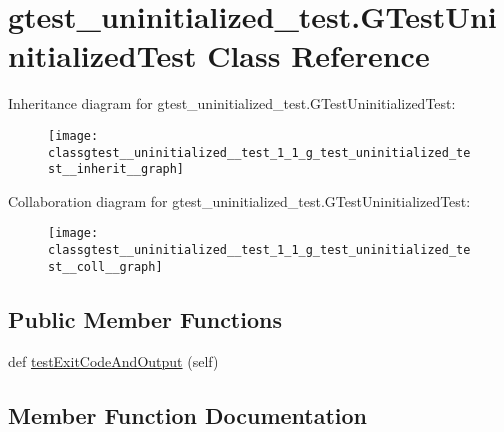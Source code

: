 \hypertarget{classgtest__uninitialized__test_1_1_g_test_uninitialized_test}{}\section{gtest\+\_\+uninitialized\+\_\+test.\+G\+Test\+Uninitialized\+Test Class Reference}
\label{classgtest__uninitialized__test_1_1_g_test_uninitialized_test}


Inheritance diagram for gtest\+\_\+uninitialized\+\_\+test.\+G\+Test\+Uninitialized\+Test\+:
\nopagebreak
\begin{figure}[H]
\begin{center}
\leavevmode
\texttt{[image: classgtest\_\_uninitialized\_\_test\_1\_1\_g\_test\_uninitialized\_test\_\_inherit\_\_graph]}
\end{center}
\end{figure}


Collaboration diagram for gtest\+\_\+uninitialized\+\_\+test.\+G\+Test\+Uninitialized\+Test\+:
\nopagebreak
\begin{figure}[H]
\begin{center}
\leavevmode
\texttt{[image: classgtest\_\_uninitialized\_\_test\_1\_1\_g\_test\_uninitialized\_test\_\_coll\_\_graph]}
\end{center}
\end{figure}
\subsection*{Public Member Functions}
\begin{DoxyCompactItemize}
\item 
def \hyperlink{classgtest__uninitialized__test_1_1_g_test_uninitialized_test_ace4bbad0abec476b03a91bb453e6451c}{test\+Exit\+Code\+And\+Output} (self)
\end{DoxyCompactItemize}


\subsection{Member Function Documentation}
